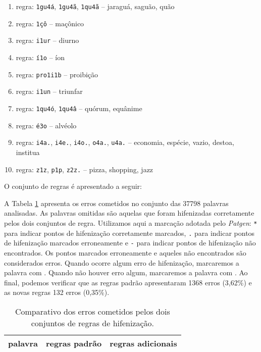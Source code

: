 \documentclass{article}
\newcommand{\cmark}{\ding{51}}%
\newcommand{\xmark}{\ding{55}}%
\begin{document}
\begin{enumerate}
\item regra: \texttt{1gu4á}, \texttt{1gu4ã}, \texttt{1qu4ã} -- jaraguá, saguão, quão

\item regra: \texttt{1çô} -- maçônico

\item regra: \texttt{i1ur} -- diurno

\item regra: \texttt{í1o} -- íon

\item regra: \texttt{pro1i1b} -- proibição

\item regra: \texttt{i1un} -- triunfar


\item regra: \texttt{1qu4ó}, \texttt{1qu4â} -- quórum, equânime

\item regra: \texttt{é3o} -- alvéolo

\item regra: \texttt{i4a.}, \texttt{i4e.}, \texttt{i4o.}, \texttt{o4a.}, \texttt{u4a.} -- economia, espécie, vazio, destoa, institua 

\item regra: \texttt{z1z}, \texttt{p1p}, \texttt{z2z.} -- pizza, shopping, jazz

\end{enumerate}


O conjunto de \NumberOfNewRules{} regras é apresentado a seguir:
\begin{multicols}{4}
    
\end{multicols}

A Tabela \ref{tab-resultados} apresenta os erros cometidos no conjunto das
37798 palavras analisadas. As palavras omitidas são aquelas que foram
hifenizadas corretamente pelos dois conjuntos de regra. Utilizamos aqui a
marcação adotada pelo \emph{Patgen}: \texttt{*} para indicar pontos de
hifenização corretamente marcados, \texttt{.} para indicar pontos de hifenização
marcados erroneamente e \texttt{-} para indicar pontos de hifenização não
encontrados. Os pontos marcados erroneamente e aqueles não encontrados são
considerados erros. Quando ocorre algum erro de hifenização, marcaremos a
palavra com \xmark. Quando não houver erro algum, marcaremos a palavra com
\cmark. Ao final, podemos verificar que as regras padrão apresentaram 1368 erros
(3,62\%) e as novas regras 132 erros (0,35\%).

\begin{longtable}{l l l}
\caption{Comparativo dos erros cometidos pelos dois conjuntos de regras de
hifenização.}\label{tab-resultados}\\
    \hline
    palavra & regras padrão & regras adicionais \\
    \hline
    \endhead
    
\end{longtable}


\printbibliography
\end{document}
